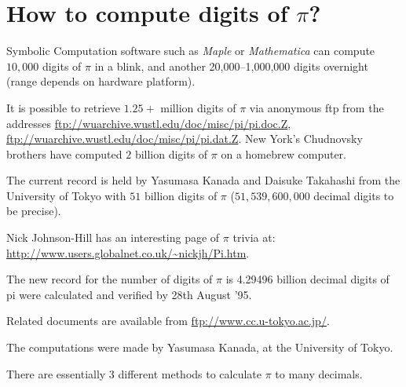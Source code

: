 \section{How to compute digits of $\pi$?}

Symbolic Computation software such as {\it Maple} or {\it Mathematica}
can compute $10,000$ digits of $\pi$ in a blink, and another
20,000--1,000,000 digits overnight (range depends on hardware
platform).

It is possible to retrieve $1.25+$ million digits of $\pi$ via anonymous
ftp from the addresses
\url{ftp://wuarchive.wustl.edu/doc/misc/pi/pi.doc.Z},
\url{ftp://wuarchive.wustl.edu/doc/misc/pi/pi.dat.Z}.  New York's
Chudnovsky brothers have computed $2$ billion digits of $\pi$ on a
homebrew computer.

The current record is held by Yasumasa Kanada and Daisuke Takahashi from
the University of Tokyo with $51$ billion digits of $\pi$
($51,539,600,000$ decimal digits to be precise).

Nick Johnson-Hill has an interesting page of $\pi$ trivia at:
\url{http://www.users.globalnet.co.uk/~nickjh/Pi.htm}.

The new record for the number of digits of $\pi$ is 4.29496 billion
decimal digits of pi were calculated and verified by 28th August '95.

Related documents are available from \url{ftp://www.cc.u-tokyo.ac.jp/}.

The computations were made by Yasumasa Kanada, at the University of
Tokyo.

There are essentially 3 different methods to calculate $\pi$ to many
decimals.

